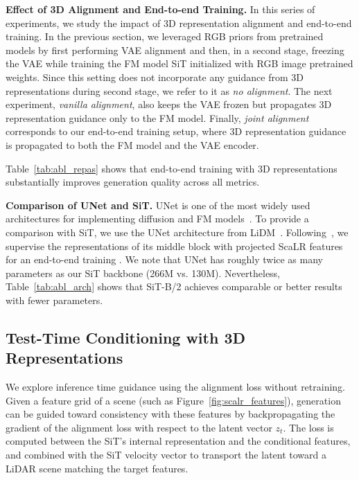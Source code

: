 \textbf{Effect of 3D Alignment and End-to-end Training.}
In this series of experiments, we study the impact of 3D representation alignment and end-to-end training. 
In the previous section, we leveraged RGB priors from pretrained models by first performing VAE alignment and then, in a second stage, freezing the VAE while training the FM model SiT initialized with RGB image pretrained weights. Since this setting does not incorporate any guidance from 3D representations during second stage, we refer to it as \textit{no alignment}. 
The next experiment, \textit{vanilla alignment}, also keeps the VAE frozen but propagates 3D representation guidance only to the FM model. 
Finally, \textit{joint alignment} corresponds to our end-to-end training setup, where 3D representation guidance is propagated to both the FM model and the VAE encoder.

Table~\ref{tab:abl_repas} shows that end-to-end training with 3D representations substantially improves generation quality across all metrics.


\textbf{Comparison of UNet and SiT.} UNet is one of the most widely used architectures for implementing diffusion and FM models~\cite{ran_towards_2024,nakashima_lidar_2024, zyrianov2022learning,hu_rangeldm_2024}. 
To provide a comparison with SiT, we use the UNet architecture from LiDM~\cite{ran_towards_2024}. Following~\cite{tian_u-repa_2025}, we supervise the representations of its middle block with projected ScaLR \cite{puy2024three} features for an end-to-end training .  
We note that UNet has roughly twice as many parameters as our SiT backbone (266M vs. 130M). 
Nevertheless, Table~\ref{tab:abl_arch} shows that SiT-B/2 achieves comparable or better results with fewer parameters.



\subsection{Test-Time Conditioning with 3D Representations}

We explore inference time guidance using the alignment loss without retraining.
Given a feature grid of a scene (such as Figure~\ref{fig:scalr_features}), generation can be guided toward consistency with these features by backpropagating the gradient of the alignment loss with respect to the latent vector $z_t$. 
The loss is computed between the SiT's internal representation and the conditional features, and combined with the SiT velocity vector to transport the latent toward a LiDAR scene matching the target features.  

